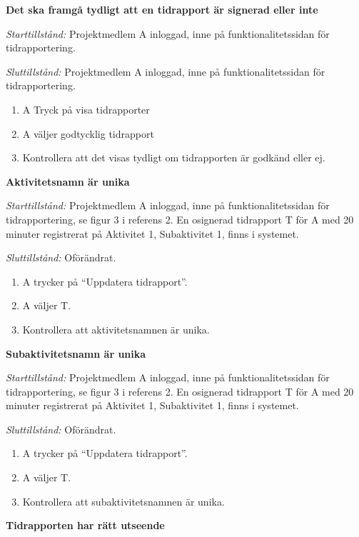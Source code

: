 \documentclass[a4paper]{article}
\begin{document}
\begin{FT}
\item
\textbf{Det ska framgå tydligt att en tidrapport är signerad eller inte}

\emph{Starttillstånd:} Projektmedlem A inloggad, inne på funktionalitetssidan för tidrapportering.

\emph{Sluttillstånd:} Projektmedlem A inloggad, inne på funktionalitetssidan för tidrapportering.

\begin{enumerate}
\item A Tryck på visa tidrapporter
\item A väljer godtycklig tidrapport
\item Kontrollera att det visas tydligt om tidrapporten är godkänd eller ej.
\end{enumerate}

\item\textbf{Aktivitetsnamn är unika}

\emph{Starttillstånd:} Projektmedlem A inloggad, inne på funktionalitetssidan för tidrapportering, se figur 3 i referens 2. En osignerad tidrapport T för A med 20 minuter registrerat på Aktivitet 1, Subaktivitet 1, finns i systemet.

\emph{Sluttillstånd:} Oförändrat.

\begin{enumerate}
\item A trycker på ``Uppdatera tidrapport''.
\item A väljer T.
\item Kontrollera att aktivitetsnamnen är unika.
\end{enumerate}

\item\textbf{Subaktivitetsnamn är unika}

\emph{Starttillstånd:} Projektmedlem A inloggad, inne på funktionalitetssidan för tidrapportering, se figur 3 i referens 2. En osignerad tidrapport T för A med 20 minuter registrerat på Aktivitet 1, Subaktivitet 1, finns i systemet.

\emph{Sluttillstånd:} Oförändrat.

\begin{enumerate}
\item A trycker på ``Uppdatera tidrapport''.
\item A väljer T.
\item Kontrollera att subaktivitetsnamnen är unika.
\end{enumerate}

\item\textbf{Tidrapporten har rätt utseende}


\end{FT}
\end{document}
